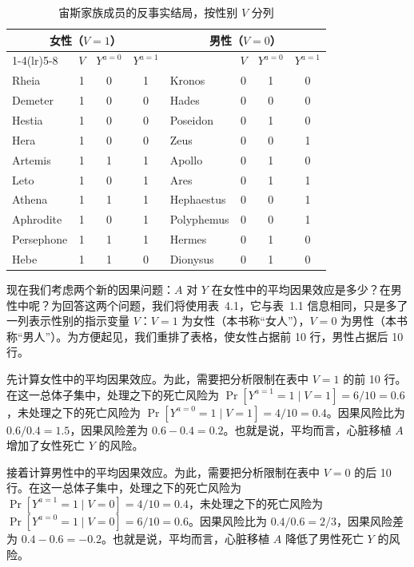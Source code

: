\begin{table}[htbp]
\centering
\caption{宙斯家族成员的反事实结局，按性别 $V$ 分列}
\label{tab:4.1}
\small
\renewcommand{\arraystretch}{1.0}
\begin{tabular}{lccc@{\hspace{1.8em}}lccc}
\toprule
\multicolumn{4}{c}{女性（$V=1$）} & \multicolumn{4}{c}{男性（$V=0$）}\\
\cmidrule(lr){1-4}\cmidrule(lr){5-8}
 & $V$ & $Y^{a=0}$ & $Y^{a=1}$ & & $V$ & $Y^{a=0}$ & $Y^{a=1}$\\
\midrule
Rheia      & 1 & 0 & 1 & Kronos     & 0 & 1 & 0\\
Demeter    & 1 & 0 & 0 & Hades      & 0 & 0 & 0\\
Hestia     & 1 & 0 & 0 & Poseidon   & 0 & 1 & 0\\
Hera       & 1 & 0 & 0 & Zeus       & 0 & 0 & 1\\
Artemis    & 1 & 1 & 1 & Apollo     & 0 & 1 & 0\\
Leto       & 1 & 0 & 1 & Ares       & 0 & 1 & 1\\
Athena     & 1 & 1 & 1 & Hephaestus & 0 & 0 & 1\\
Aphrodite  & 1 & 0 & 1 & Polyphemus & 0 & 0 & 1\\
Persephone & 1 & 1 & 1 & Hermes     & 0 & 1 & 0\\
Hebe       & 1 & 1 & 0 & Dionysus   & 0 & 1 & 0\\
\bottomrule
\end{tabular}
\end{table}

现在我们考虑两个新的因果问题：$A$ 对 $Y$ 在女性中的平均因果效应是多少？在男性中呢？为回答这两个问题，我们将使用表~4.1，它与表~1.1 信息相同，只是多了一列表示性别的指示变量 $V$：$V=1$ 为女性（本书称“女人”），$V=0$ 为男性（本书称“男人”）。为方便起见，我们重排了表格，使女性占据前 10 行，男性占据后 10 行。

先计算女性中的平均因果效应。为此，需要把分析限制在表中 $V=1$ 的前 10 行。在这一总体子集中，处理之下的死亡风险为 $\Pr[Y^{a=1}=1\mid V=1]=6/10=0.6$，未处理之下的死亡风险为 $\Pr[Y^{a=0}=1\mid V=1]=4/10=0.4$。因果风险比为 $0.6/0.4=1.5$，因果风险差为 $0.6-0.4=0.2$。也就是说，平均而言，心脏移植 $A$ 增加了女性死亡 $Y$ 的风险。

接着计算男性中的平均因果效应。为此，需要把分析限制在表中 $V=0$ 的后 10 行。在这一总体子集中，处理之下的死亡风险为 $\Pr[Y^{a=1}=1\mid V=0]=4/10=0.4$，未处理之下的死亡风险为 $\Pr[Y^{a=0}=1\mid V=0]=6/10=0.6$。因果风险比为 $0.4/0.6=2/3$，因果风险差为 $0.4-0.6=-0.2$。也就是说，平均而言，心脏移植 $A$ 降低了男性死亡 $Y$ 的风险。

